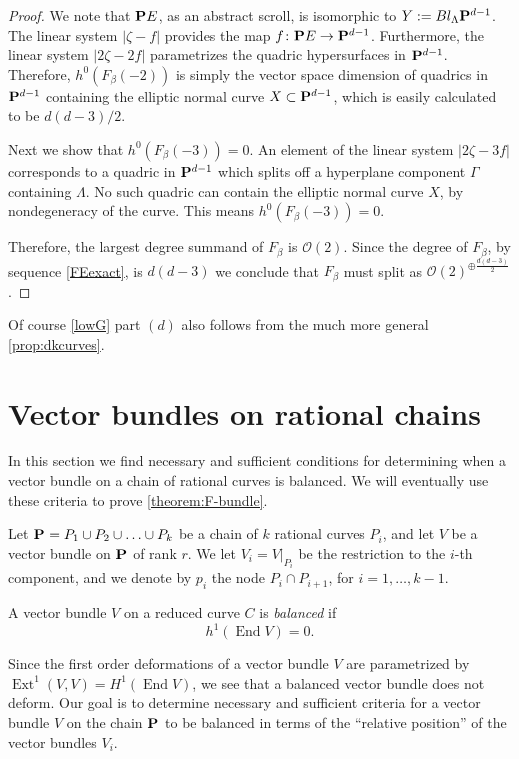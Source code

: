 \documentclass[11pt, two side, letterpaper, final]{amsart}
\renewcommand{\P}{{\bf P}}
\newcommand {\from}{\colon}
\DeclareMathOperator{\Ext}{Ext}
\DeclareMathOperator{\End}{End}
\newcommand{\cO}{\mathcal{O}}
\newcommand{\chain}[1]{\P_{#1}}
\begin{document}
\begin{proof}
We note that $\P E$, as an abstract scroll, is isomorphic to $Y := Bl_{\Lambda}\P^{d-1}$. The linear system $|\zeta - f|$ provides the map $f \from \P E \to \P^{d-1}$.  Furthermore, the linear system $|2\zeta - 2f|$ parametrizes the quadric hypersurfaces in $\P^{d-1}$.  Therefore, $h^{0}(F_{\beta}(-2))$ is simply the vector space dimension of quadrics in $\P^{d-1}$ containing the elliptic normal curve $X \subset \P^{d-1}$, which is easily calculated to be $d(d-3)/2$. 

Next we show that $h^{0}(F_{\beta}(-3)) = 0$. An element of the linear system $|2\zeta - 3f|$ corresponds to a quadric in $\P^{d-1}$ which splits off a  hyperplane component $\Gamma$ containing $\Lambda$.  No such quadric can contain the elliptic normal curve $X$, by nondegeneracy of the curve.  This means  $h^{0}(F_{\beta}(-3)) = 0$.  

Therefore, the largest degree summand of $F_{\beta}$ is $\cO(2)$. Since the degree of $F_{\beta}$, by sequence \eqref{FEexact}, is $d(d-3)$ we conclude that $F_{\beta}$ must split as $\cO(2)^{\oplus \frac{d(d-3)}{2}}$.
\end{proof}
\begin{remark}
Of course \cref{lowG} part $(d)$ also follows from the much more general \cref{prop:dkcurves}. 
\end{remark}

 

\section{Vector bundles on rational chains}
\label{sec:vector-bundles-on-rational-chains}
In this section we find necessary and sufficient conditions for determining when a vector bundle on a chain of rational curves is balanced.  We will eventually use these criteria to prove \cref{theorem:F-bundle}.  

Let $\chain{} = P_{1} \cup P_{2} \cup \ldots \cup P_{k}$ be a chain of $k$ rational curves $P_{i}$, and let $V$ be a vector bundle on $\chain{}$ of rank $r$.  We let $V_{i} = V|_{P_{i}}$ be the restriction to the $i$-th component, and we denote by $p_{i}$ the node $P_{i} \cap P_{i+1}$, for $i=1,\ldots,k-1$.  
\begin{definition}
A vector bundle $V$ on a reduced curve $C$ is \emph{balanced} if $$h^{1}(\End V) = 0.$$ 
\end{definition}
Since the first order deformations of a vector bundle $V$ are parametrized by $\Ext^1(V,V) = H^{1}(\End V)$, we see that a balanced vector bundle does not deform.  Our goal is to determine necessary and sufficient criteria for a vector bundle $V$ on the chain $\chain{}$ to be balanced in terms of the ``relative position'' of the vector bundles $V_{i}$. 
\end{document}
